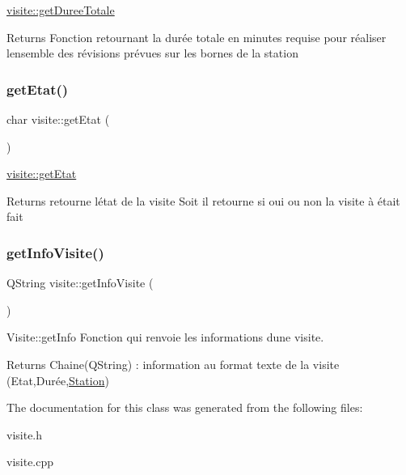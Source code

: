 \hyperlink{classvisite_a608738dbddc358c0805228e0aac5818c}{visite\+::get\+Duree\+Totale} 

\begin{DoxyReturn}{Returns}
Fonction retournant la durée totale en minutes requise pour réaliser l\textquotesingle{}ensemble des révisions prévues sur les bornes de la station 
\end{DoxyReturn}
\mbox{\label{classvisite_a6da950d2a01048158c7abcc1ebdfec22}} 
\subsubsection{\texorpdfstring{get\+Etat()}{getEtat()}}
{\footnotesize\ttfamily char visite\+::get\+Etat (\begin{DoxyParamCaption}{ }\end{DoxyParamCaption})}



\hyperlink{classvisite_a6da950d2a01048158c7abcc1ebdfec22}{visite\+::get\+Etat} 

\begin{DoxyReturn}{Returns}
retourne l\textquotesingle{}état de la visite Soit il retourne si oui ou non la visite à était fait 
\end{DoxyReturn}
\mbox{\label{classvisite_a7a948dd8b5c805a1f2a7d62c9268cb97}} 
\subsubsection{\texorpdfstring{get\+Info\+Visite()}{getInfoVisite()}}
{\footnotesize\ttfamily Q\+String visite\+::get\+Info\+Visite (\begin{DoxyParamCaption}{ }\end{DoxyParamCaption})}



Visite\+::get\+Info Fonction qui renvoie les informations d\textquotesingle{}une visite. 

\begin{DoxyReturn}{Returns}
Chaine(\+Q\+String) \+: information au format texte de la visite (Etat,Durée,\hyperlink{class_station}{Station}) 
\end{DoxyReturn}


The documentation for this class was generated from the following files\+:\begin{DoxyCompactItemize}
\item 
visite.\+h\item 
visite.\+cpp\end{DoxyCompactItemize}
